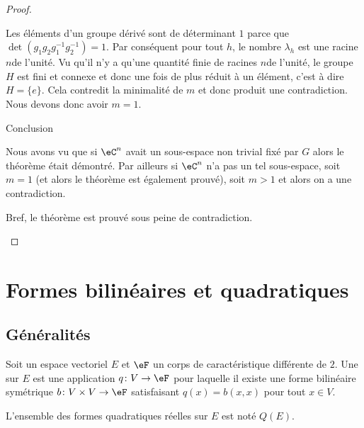 \begin{proof}
\begin{subproof}
        Les éléments d'un groupe dérivé sont de déterminant \( 1\) parce que \( \det(g_1g_2g_1^{-1}g_2^{-1})=1\). Par conséquent pour tout \( h\), le nombre \( \lambda_h\) est une racine \( n\)\ieme de l'unité. Vu qu'il n'y a qu'une quantité finie de racines \( n\)\ieme de l'unité, le groupe \( H\) est fini et connexe et donc une fois de plus réduit à un élément, c'est à dire \( H=\{ e \}\). Cela contredit la minimalité de \( m\) et donc produit une contradiction. Nous devons donc avoir \( m=1\).

    \item[Conclusion]

        Nous avons vu que si \( \eC^n\) avait un sous-espace non trivial fixé par \( G\) alors le théorème était démontré. Par ailleurs si \( \eC^n\) n'a pas un tel sous-espace, soit \( m=1\) (et alors le théorème est également prouvé), soit \( m>1\) et alors on a une contradiction.

        Bref, le théorème est prouvé sous peine de contradiction.
    \end{subproof}
\end{proof}

\section{Formes bilinéaires et quadratiques}
\label{SecTQkRXIu}

\subsection{Généralités}

\begin{definition}   \label{DefBSIoouvuKR}
    Soit un espace vectoriel \( E\) et \( \eF\) un corps de caractéristique différente de \( 2\). Une  sur \( E\) est une application \( q\colon V\to \eF\) pour laquelle il existe une forme bilinéaire symétrique \( b\colon V\times V\to \eF\) satisfaisant \( q(x)=b(x,x)\) pour tout \( x\in V\).

    L'ensemble des formes quadratiques réelles sur \( E\) est noté \( Q(E)\).
\end{definition}

